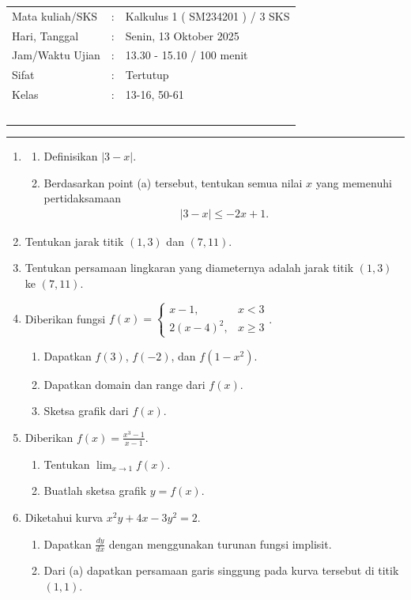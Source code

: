 \documentclass[10pt,openany,a4paper]{article}
\theoremstyle{definition}
\theoremstyle{definition}
\theoremstyle{plain}
\begin{document}
    \begin{center}
	\begin{tabular}{lcl}
		Mata kuliah/SKS & : & Kalkulus 1 ( SM234201 ) / 3 SKS\\
		Hari, Tanggal & : & Senin, 13 Oktober 2025\\
		Jam/Waktu Ujian & : & 13.30 - 15.10 / 100 menit\\
		Sifat & : & Tertutup\\
		Kelas & : & 13-16, 50-61\\
  ~
	\end{tabular}
    
    \noindent\rule{\textwidth}{2.pt}
        \end{center}
        \begin{enumerate}
            \item \begin{enumerate}
                \item Definisikan $|3-x|$.
                \item Berdasarkan point (a) tersebut, tentukan semua nilai $x$ yang memenuhi pertidaksamaan 
                \begin{align*}
                    |3-x|\leq -2x+1.
                \end{align*}
            \end{enumerate}
            \item Tentukan jarak titik $(1,3)$ dan $(7,11)$.
            \item Tentukan persamaan lingkaran yang diameternya adalah jarak titik $(1,3)$ ke $(7,11)$.
            \item Diberikan fungsi $f(x)=\begin{cases}
                x-1, &x<3\\
                2(x-4)^2, &x\geq 3
            \end{cases}$.
            \begin{enumerate}
                \item Dapatkan $f(3)$, $f(-2)$, dan $f(1-x^2)$.
                \item Dapatkan domain dan range dari $f(x)$.
                \item Sketsa grafik dari $f(x)$.
            \end{enumerate}
            \item Diberikan $f(x)=\frac{x^3-1}{x-1}$.
            \begin{enumerate}
                \item Tentukan $\displaystyle\lim_{x\to 1}f(x)$.
                \item Buatlah sketsa grafik $y=f(x)$.
            \end{enumerate}
            \item Diketahui kurva $x^2y+4x-3y^2=2$.
            \begin{enumerate}
                \item Dapatkan $\frac{dy}{dx}$ dengan menggunakan turunan fungsi implisit.
                \item Dari (a) dapatkan persamaan garis singgung pada kurva tersebut di titik $(1,1)$.
            \end{enumerate}
        \end{enumerate}
\end{document}
